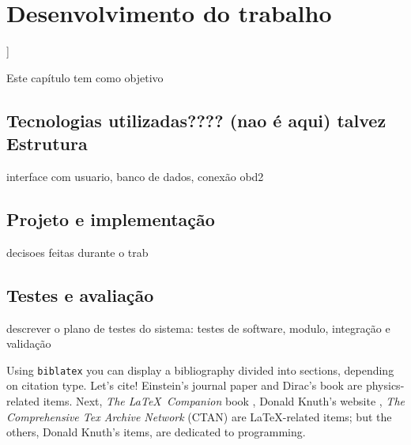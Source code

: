 \chapter{Desenvolvimento do trabalho}]

\label{CAP5}


Este capítulo tem como objetivo 


\section{Tecnologias utilizadas???? (nao é aqui) talvez Estrutura}
interface com usuario, banco de dados, conexão obd2

\section{Projeto e implementação}
decisoes feitas durante o trab

\section{Testes e avaliação}
descrever o plano de testes do sistema: testes de software, modulo, integração e validação

Using \texttt{biblatex} you can display a bibliography divided into sections, depending on citation type. 
Let's cite! Einstein's journal paper \cite{einstein} and Dirac's book \cite{dirac} are physics-related items. 
Next, \textit{The \LaTeX\ Companion} book \cite{latexcompanion}, Donald Knuth's website \cite{knuthwebsite}, \textit{The Comprehensive Tex Archive Network} (CTAN) \cite{ctan} are \LaTeX-related items; but the others, Donald Knuth's items, \cite{knuth-fa,knuth-acp} are dedicated to programming. 

